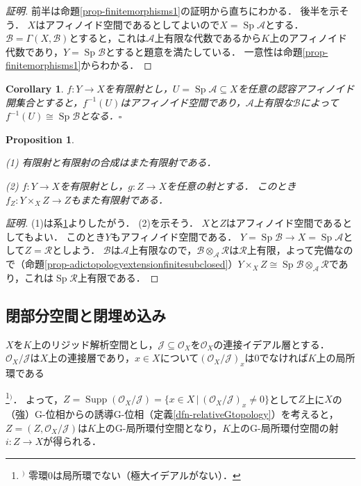 \documentclass[a4paper,12pt, dvipdfmx]{jsbook}
\def\O{\mathscr{O}}
\def\Sp{\mathop{\mathrm{Sp}}\nolimits}
\def\Supp{\mathop{\mathrm{Supp}}\nolimits}
\theoremstyle{plain}
\newtheorem{prop}[thm]{\bfseries Proposition}
\newtheorem{cor}[thm]{\bfseries Corollary}
\theoremstyle{definition}
\newcounter{chushaku}
\def\chu#1{\addtocounter{chushaku}{1}\footnote[\value{chushaku}]{${}^)$ #1}${}^)$}
\begin{document}
\begin{proof}[証明]
前半は命題\ref{prop-finitemorphisms1}の証明から直ちにわかる．
後半を示そう．
$X$はアフィノイド空間であるとしてよいので$X=\Sp\mathcal{A}$とする．
$\mathcal{B}=\Gamma(X,\mathscr{B})$とすると，これは$\mathcal{A}$上有限な代数であるから$K$上のアフィノイド代数であり，$Y=\Sp\mathcal{B}$とすると題意を満たしている．
一意性は命題\ref{prop-finitemorphisms1}からわかる．
\end{proof}

\begin{cor}\label{cor-finitemorphisms1}{\rm 
$f\colon Y\rightarrow X$を有限射とし，$U=\Sp\mathcal{A}\subseteq X$を任意の認容アフィノイド開集合とすると，$f^{-1}(U)$はアフィノイド空間であり，$\mathcal{A}$上有限な$\mathcal{B}$によって$f^{-1}(U)\cong\Sp\mathcal{B}$となる．}\hfill$\square$
\end{cor}

\begin{prop}\label{prop-finitemorphisms2}{\rm 
(1) 有限射と有限射の合成はまた有限射である．

(2) $f\colon Y\rightarrow X$を有限射とし，$g\colon Z\rightarrow X$を任意の射とする．
このとき$f_Z\colon Y\times_XZ\rightarrow Z$もまた有限射である．}
\end{prop}

\begin{proof}[証明]
(1)は系\ref{cor-finitemorphisms1}よりしたがう．
(2)を示そう．
$X$と$Z$はアフィノイド空間であるとしてもよい．
このとき$Y$もアフィノイド空間である．
$Y=\Sp\mathcal{B}\rightarrow X=\Sp\mathcal{A}$として$Z=\mathcal{R}$としよう．
$\mathcal{B}$は$\mathcal{A}$上有限なので，$\mathcal{B}\otimes_{\mathcal{A}}\mathcal{R}$は$\mathcal{R}$上有限，よって完備なので（命題\ref{prop-adictopologyextensionfinitesubclosed}）$Y\times_XZ\cong\Sp\mathcal{B}\otimes_{\mathcal{A}}\mathcal{R}$であり，これは$\Sp\mathcal{R}$上有限である．
\end{proof}

\subsection{閉部分空間と閉埋め込み}\label{sub-closedimmersions}
$X$を$K$上のリジッド解析空間とし，$\mathscr{J}\subseteq\O_X$を$\O_X$の連接イデアル層とする．
$\O_X/\mathscr{J}$は$X$上の連接層であり，$x\in X$について$(\O_X/\mathscr{J})_x$は$0$でなければ$K$上の局所環である\chu{零環$0$は局所環でない（極大イデアルがない）．}．
よって，$Z=\Supp(\O_X/\mathscr{J})=\{x\in X\,|\,(\O_X/\mathscr{J})_x\neq 0\}$として$Z$上に$X$の（強）G-位相からの誘導G-位相（定義\ref{dfn-relativeGtopology}）を考えると，$Z=(Z,\O_X/\mathscr{J})$は$K$上のG-局所環付空間となり，$K$上のG-局所環付空間の射$i\colon Z\rightarrow X$が得られる．
\end{document}
